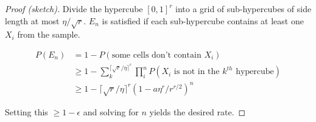 \documentclass[12pt]{article}
\begin{document}
\begin{proof}[Proof (sketch)]
Divide the hypercube $[0, 1]^r$ into a grid of sub-hypercubes of side length at most $\eta / \sqrt{r}$. 
$E_n$ is satisfied if each sub-hypercube contains at least one $X_i$ from the sample. 

$$
\begin{aligned}
P(E_n) & = 1 - P(\text{some cells don't contain } X_i) \\
& \geq 1 - \sum_k^{\lceil \sqrt{r} / \eta \rceil^r} \prod_i^n P(X_i \text{ is not in the } k^{th} \text{ hypercube}) \\
& \geq 1 - \lceil \sqrt{r} / \eta \rceil^r (1 - a \eta^r / r^{r/2})^n
\end{aligned}
$$

Setting this $\geq 1 - \epsilon$ and solving for $n$ yields the desired rate. 
\end{proof}



\end{document}
